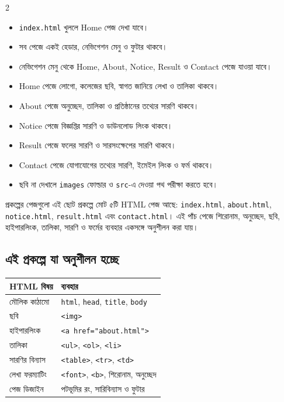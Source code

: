 \par\noindent
\begin{multicols}{2}
\begin{itemize}
\item \texttt{index.html} খুললে Home পেজ দেখা যাবে।
\item সব পেজে একই হেডার, নেভিগেশন মেনু ও ফুটার থাকবে।
\item নেভিগেশন মেনু থেকে Home, About, Notice, Result ও Contact পেজে যাওয়া যাবে।
\item Home পেজে লোগো, কলেজের ছবি, স্বাগত জানিয়ে লেখা ও তালিকা থাকবে।
\item About পেজে অনুচ্ছেদ, তালিকা ও প্রতিষ্ঠানের তথ্যের সারণি থাকবে।


\item Notice পেজে বিজ্ঞপ্তির সারণি ও ডাউনলোড লিংক থাকবে।
\item Result পেজে ফলের সারণি ও সারসংক্ষেপের সারণি থাকবে।
\item Contact পেজে যোগাযোগের তথ্যের সারণি, ইমেইল লিংক ও ফর্ম থাকবে।
\item ছবি না দেখালে \texttt{images} ফোল্ডার ও \texttt{src}-এ দেওয়া পথ পরীক্ষা করতে হবে।
\end{itemize}
\end{multicols}
\par


\begin{keypointbox}{প্রকল্পের পেজগুলো}
এই ছোট প্রকল্পে মোট ৫টি HTML পেজ আছে: \texttt{index.html}, \texttt{about.html}, \texttt{notice.html}, \texttt{result.html} এবং \texttt{contact.html}। এই পাঁচ পেজে শিরোনাম, অনুচ্ছেদ, ছবি, হাইপারলিংক, তালিকা, সারণি ও ফর্মের ব্যবহার একসঙ্গে অনুশীলন করা যায়।
\end{keypointbox}

\subsection{এই প্রকল্পে যা অনুশীলন হচ্ছে}

\begin{center}
\begin{tabular}{|p{}|p{}|}
\hline
\textbf{HTML বিষয়} & \textbf{ব্যবহার} \\
\hline
মৌলিক কাঠামো & \texttt{html}, \texttt{head}, \texttt{title}, \texttt{body} \\
\hline
ছবি & \texttt{<img>} \\
\hline
হাইপারলিংক & \texttt{<a href="about.html">} \\
\hline
তালিকা & \texttt{<ul>}, \texttt{<ol>}, \texttt{<li>} \\
\hline
সারণির বিন্যাস & \texttt{<table>}, \texttt{<tr>}, \texttt{<td>} \\
\hline
লেখা ফরম্যাটিং & \texttt{<font>}, \texttt{<b>}, শিরোনাম, অনুচ্ছেদ \\
\hline
পেজ ডিজাইন & পটভূমির রং, সারিবিন্যাস ও ফুটার \\
\hline
\end{tabular}
\end{center}


